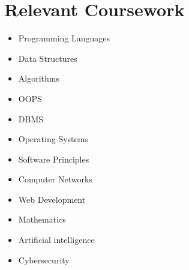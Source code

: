 \documentclass[letterpaper,11pt]{article}
\makeatletter
\newcommand{\resumeItem}[1]{
  \item\small{
    {#1 \vspace{-2pt}}
  }
}
\newcommand{\resumeSubheading}[4]{
  \vspace{-2pt}\item
    \begin{tabular*}{1.0\textwidth}[t]{l@{\extracolsep{\fill}}r}
      \textbf{#1} & \textbf{\small #2} \\
      \textit{\small#3} & \textit{\small #4} \\
    \end{tabular*}\vspace{-7pt}
}
\newcommand{\resumeSubHeadingListStart}{\begin{itemize}[leftmargin=0.0in, label={}]}
\newcommand{\resumeSubHeadingListEnd}{\end{itemize}}
\newcommand{\resumeItemListStart}{\begin{itemize}}
\newcommand{\resumeItemListEnd}{\end{itemize}\vspace{-5pt}}
\makeatother
\begin{document}
\section{Relevant Coursework}
        \begin{multicols}{4}
            \begin{itemize}[itemsep=-5pt, parsep=3pt]
                \item\small Programming Languages
                \item Data Structures
                \item Algorithms
                \item OOPS
                \item DBMS
                \item Operating Systems
                \item Software Principles
                \item Computer Networks
                \item Web Development
                \item Mathematics
                \item Artificial intelligence
                \item Cybersecurity
            \end{itemize}
        \end{multicols}
        \vspace*{2.0\multicolsep}



\end{document}
